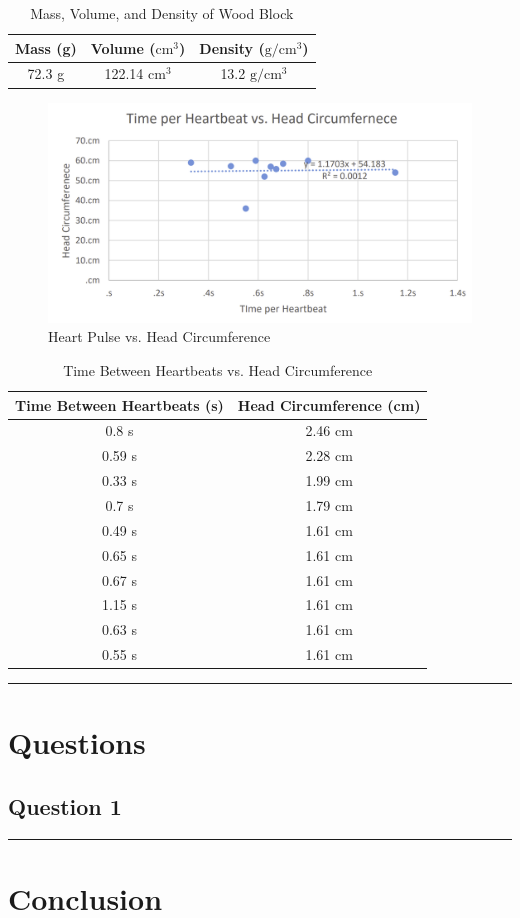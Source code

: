 \documentclass{article}
\begin{document}
\begin{table}[H]
\centering
\begin{tabular}{|c|c|c|}
    \hline
    \rowcolor{black}
    \color{white} Mass (g) & \color{white} Volume ($\mathrm{cm}^3$) & \color{white} Density ($\mathrm{g}/\mathrm{cm}^3$) \\
    \hline
    72.3 g & 122.14 $\mathrm{cm}^3$ & 13.2 $\mathrm{g}/\mathrm{cm}^3$ \\

    \hline
\end{tabular} 
\caption{Mass, Volume, and Density of Wood Block}
\end{table}

\begin{figure}[H]
    \includegraphics[width=16cm]{lab1_plot2.png}
    \caption{Heart Pulse vs. Head Circumference}
    \label{plot:3}
\end{figure}

\begin{table}[H]
\centering
\begin{tabular}{|c|c|}
    \hline
    \rowcolor{black}
    \color{white} Time Between Heartbeats (s) & \color{white} Head Circumference (cm) \\
    \hline
    0.8 s  & 2.46 cm \\
    \hline
    0.59 s & 2.28 cm \\
    \hline
    0.33 s & 1.99 cm \\
    \hline
    0.7 s  & 1.79 cm \\
    \hline
    0.49 s & 1.61 cm \\
    \hline
    0.65 s & 1.61 cm \\
    \hline
    0.67 s & 1.61 cm \\
    \hline
    1.15 s & 1.61 cm \\
    \hline
    0.63 s & 1.61 cm \\
    \hline
    0.55 s & 1.61 cm \\

    \hline
\end{tabular} 
\caption{Time Between Heartbeats vs. Head Circumference}
\end{table}

\hrule
\vspace{1em}
\section{Questions}
\subsection{Question 1}

\vspace{1em}
\hrule
\vspace{1em}
\section{Conclusion}
\end{document}
